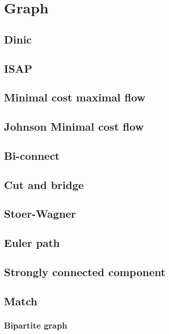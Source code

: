 \section{Graph}
\subsection{Dinic}

\subsection{ISAP}

\subsection{Minimal cost maximal flow}

\subsection{Johnson Minimal cost flow}

\subsection{Bi-connect}

\subsection{Cut and bridge}

\subsection{Stoer-Wagner}

\subsection{Euler path}

\subsection{Strongly connected component}


\subsection{Match}
\subsubsection{Bipartite graph}

